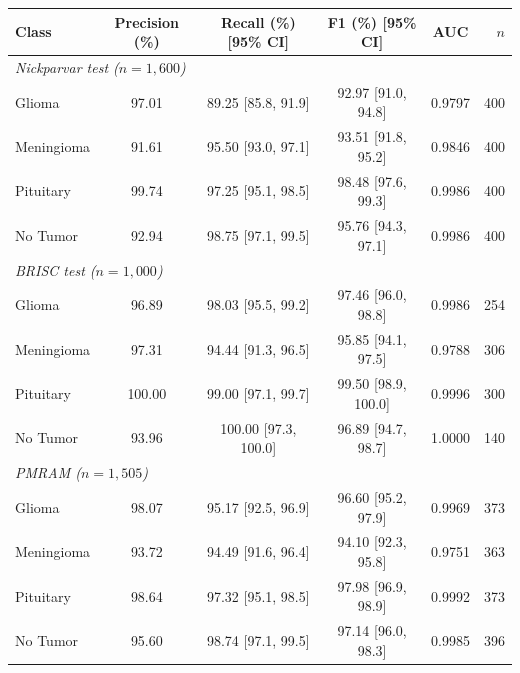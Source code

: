 \begin{tabular}{l c c c c r}
\toprule
\textbf{Class} & \textbf{Precision (\%)} & \textbf{Recall (\%) [95\% CI]} & \textbf{F1 (\%) [95\% CI]} & \textbf{AUC} & \textbf{$n$} \\
\midrule
\multicolumn{6}{l}{\textit{Nickparvar test ($n=1,600$)}} \\
\quad Glioma & 97.01 & 89.25 [85.8, 91.9] & 92.97 [91.0, 94.8] & 0.9797 & 400 \\
\quad Meningioma & 91.61 & 95.50 [93.0, 97.1] & 93.51 [91.8, 95.2] & 0.9846 & 400 \\
\quad Pituitary & 99.74 & 97.25 [95.1, 98.5] & 98.48 [97.6, 99.3] & 0.9986 & 400 \\
\quad No Tumor & 92.94 & 98.75 [97.1, 99.5] & 95.76 [94.3, 97.1] & 0.9986 & 400 \\
\multicolumn{6}{l}{\textit{BRISC test ($n=1,000$)}} \\
\quad Glioma & 96.89 & 98.03 [95.5, 99.2] & 97.46 [96.0, 98.8] & 0.9986 & 254 \\
\quad Meningioma & 97.31 & 94.44 [91.3, 96.5] & 95.85 [94.1, 97.5] & 0.9788 & 306 \\
\quad Pituitary & 100.00 & 99.00 [97.1, 99.7] & 99.50 [98.9, 100.0] & 0.9996 & 300 \\
\quad No Tumor & 93.96 & 100.00 [97.3, 100.0] & 96.89 [94.7, 98.7] & 1.0000 & 140 \\
\multicolumn{6}{l}{\textit{PMRAM ($n=1,505$)}} \\
\quad Glioma & 98.07 & 95.17 [92.5, 96.9] & 96.60 [95.2, 97.9] & 0.9969 & 373 \\
\quad Meningioma & 93.72 & 94.49 [91.6, 96.4] & 94.10 [92.3, 95.8] & 0.9751 & 363 \\
\quad Pituitary & 98.64 & 97.32 [95.1, 98.5] & 97.98 [96.9, 98.9] & 0.9992 & 373 \\
\quad No Tumor & 95.60 & 98.74 [97.1, 99.5] & 97.14 [96.0, 98.3] & 0.9985 & 396 \\
\bottomrule
\end{tabular}

